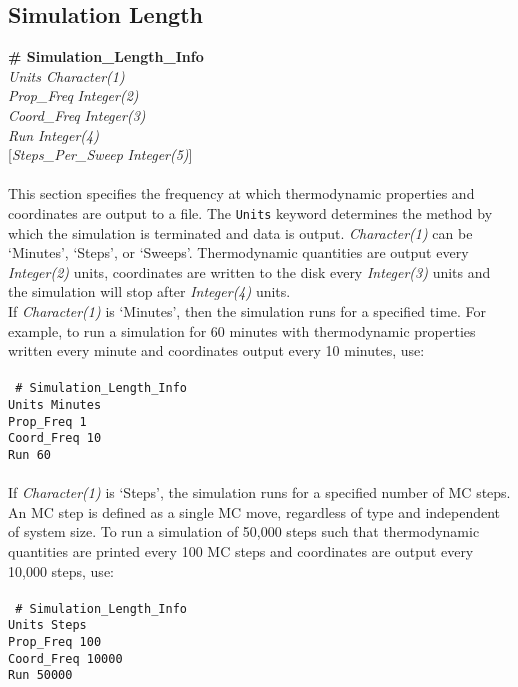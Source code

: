 \subsection{Simulation Length}\label{sec:Simulation_Length_Info}
{\bf \# Simulation\_Length\_Info} \\
{\it Units  Character(1)} \\
{\it Prop\_Freq} {\it Integer(2)} \\
{\it Coord\_Freq} {\it Integer(3)} \\
{\it Run} {\it Integer(4)} \\ 
{[}{\it Steps\_Per\_Sweep} {\it Integer(5)}] \\ \\
%
This section specifies the frequency at which thermodynamic properties and coordinates are output to a file. 
The \texttt{Units} keyword determines the method by which the simulation is terminated and data is output. 
{\it Character(1)} can be `Minutes', `Steps', or `Sweeps'. 
Thermodynamic quantities are output every {\it Integer(2)} units,
coordinates are written to the disk every {\it Integer(3)} units and 
the simulation will stop after {\it Integer(4)} units. \\
%
If {\it Character(1)} is `Minutes', then the simulation runs for a specified time.
For example, to run a simulation for 60 minutes with thermodynamic properties written every minute and 
coordinates output every 10 minutes, use: \\ \\
%
\texttt{
\# Simulation\_Length\_Info \\
Units         Minutes \\
Prop\_Freq    1 \\
Coord\_Freq   10 \\
Run           60 \\} \\
%
If {\it Character(1)} is `Steps', the simulation runs for a specified number of MC steps.
An MC step is defined as a single MC move, regardless of type and independent of system size. 
To run a simulation of 50,000 steps such that thermodynamic quantities are printed every 100 MC steps and 
coordinates are output every 10,000 steps, use: \\ \\
%
\texttt{
\# Simulation\_Length\_Info \\
Units           Steps \\
Prop\_Freq      100 \\
Coord\_Freq     10000 \\
Run             50000 \\ } \\
